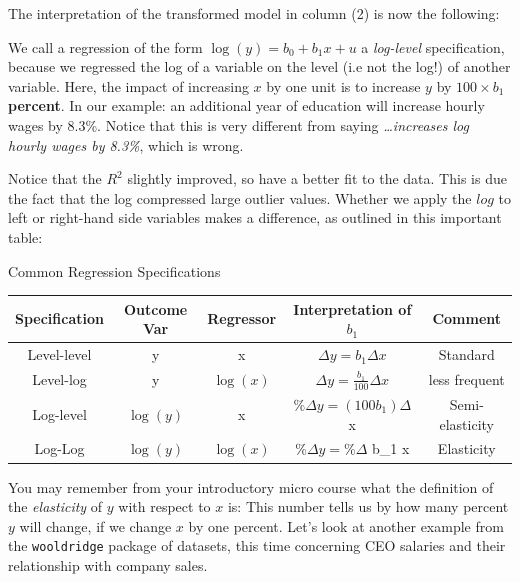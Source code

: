 \documentclass[]{book}
\newenvironment{note}{\begin{tcolorbox}[colback=blue!5!white,colframe=blue!75!black]}{\end{tcolorbox}}
\begin{document}
The interpretation of the transformed model in column (2) is now the
following:

\begin{note}
We call a regression of the form \(\log(y) = b_0 + b_1 x + u\) a
\emph{log-level} specification, because we regressed the log of a
variable on the level (i.e not the log!) of another variable. Here, the
impact of increasing \(x\) by one unit is to increase \(y\) by
\(100 \times b_1\) \textbf{percent}. In our example: an additional year
of education will increase hourly wages by 8.3\%. Notice that this is
very different from saying \emph{\ldots{}increases log hourly wages by
8.3\%}, which is wrong.
\end{note}

Notice that the \(R^2\) slightly improved, so have a better fit to the
data. This is due the fact that the log compressed large outlier values.
Whether we apply the \(log\) to left or right-hand side variables makes
a difference, as outlined in this important table:

\label{tab:loglog} Common Regression Specifications

\begin{longtable}[]{@{}ccccc@{}}
\toprule
Specification & Outcome Var & Regressor & Interpretation of \(b_1\) &
Comment\tabularnewline
\midrule
\endhead
Level-level & y & x & \(\Delta y = b_1 \Delta x\) &
Standard\tabularnewline
Level-log & y & \(\log(x)\) & \(\Delta y = \frac{b_1}{100} \Delta x\) &
less frequent\tabularnewline
Log-level & \(\log(y)\) & x & \(\% \Delta y = (100 b_1) \Delta\) x &
Semi-elasticity\tabularnewline
Log-Log & \(\log(y)\) & \(\log(x)\) & \(\% \Delta y = \% \Delta\) b\_1 x
& Elasticity\tabularnewline
\bottomrule
\end{longtable}

You may remember from your introductory micro course what the definition
of the \emph{elasticity} of \(y\) with respect to \(x\) is: This number
tells us by how many percent \(y\) will change, if we change \(x\) by
one percent. Let's look at another example from the \texttt{wooldridge}
package of datasets, this time concerning CEO salaries and their
relationship with company sales.
\end{document}
